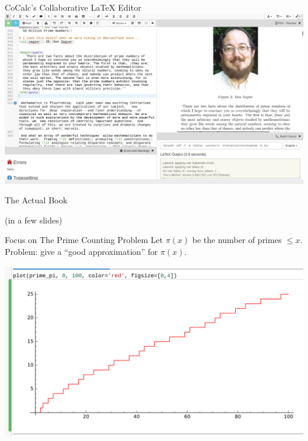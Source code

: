 \documentclass{beamer}
\begin{document}
\begin{frame}{CoCalc's Collaborative \LaTeX{} Editor}
\includegraphics[width=\textwidth]{pics/cocalc-latex}
\end{frame}

\begin{frame}{}
\vfill
\begin{center}
\hrulefill
\vfill
\Huge\sc The Actual Book
\vfill
\hrulefill
\end{center}
\vfill
\begin{center}
(in a few slides)
\end{center}
\end{frame}


\begin{frame}{Focus on The Prime Counting Problem}
  Let $\pi(x)$ be the number of primes $\leq x$.\\
  Problem: give a ``good approximation'' for $\pi(x)$.
  \vfill

  \includegraphics[width=.98\textwidth]{pics/prime-pi-100}

\end{frame}
\end{document}
